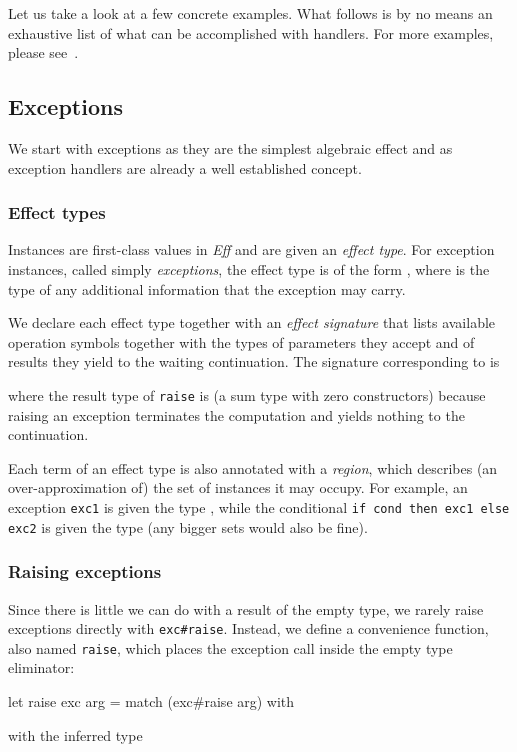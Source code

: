 \documentclass{LMCS}
\newcommand{\Eff}{\emph{Eff}\xspace}
\let\inline\lstinline
\begin{document}
Let us take a look at a few concrete examples.
What follows is by no means an exhaustive list of what can be accomplished with handlers.
For more examples, please see~\cite{plotkin2009handlers,bauer2012programming,kammar2013handlers}.


\subsection{Exceptions}

We start with exceptions as they are the simplest algebraic effect and
as exception handlers are already a well established concept.


\subsubsection{Effect types}

Instances are first-class values in \Eff and are given an \emph{effect type}.
For exception instances, called simply \emph{exceptions},
the effect type is of the form ,
where  is the type of any additional information that the exception may carry.

We declare each effect type together with an \emph{effect signature} that lists
available operation symbols together with the types of parameters they accept
and of results they yield to the waiting continuation.
The signature corresponding to  is

where the result type of \inline{raise} is  (a sum type with zero constructors)
because raising an exception terminates the computation and yields nothing to the continuation.

Each term of an effect type is also annotated with a \emph{region},
which describes (an over-approximation of) the set of instances it may occupy.
For example, an exception \inline{exc1} is given
the type ,
while the conditional \inline{if cond then exc1 else exc2} is given
the type 
(any bigger sets would also be fine).


\subsubsection{Raising exceptions}
\label{ssub:raising-exceptions}

Since there is little we can do with a result of the empty type,
we rarely raise exceptions directly with \inline{exc#raise}.
Instead, we define a convenience function, also named \inline{raise},
which places the exception call inside the empty type eliminator:
\begin{source}
  let raise exc arg =
    match (exc#raise arg) with
\end{source}
with the inferred type
\end{document}
